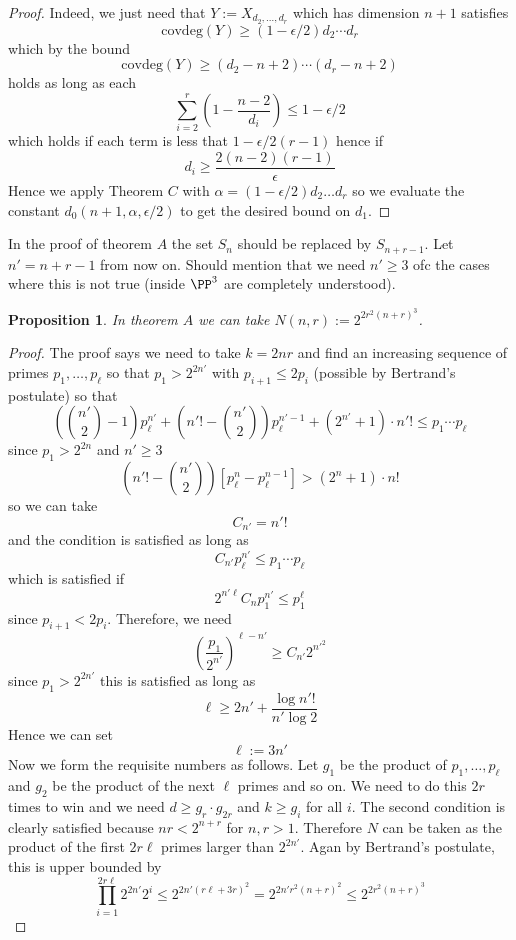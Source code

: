 \documentclass[fontsize=11pt]{amsart}
\newtheorem{prop}[thm]{Proposition}
\begin{document}
\begin{proof}
Indeed, we just need that $Y := X_{d_2, \dots, d_r}$ which has dimension $n+1$ satisfies 
\[ \mathrm{covdeg}(Y) \ge (1 - \epsilon/2) d_2 \cdots d_r \]
which by the bound
\[ \mathrm{covdeg}(Y) \ge (d_2 - n + 2) \cdots (d_r - n + 2) \]
holds as long as each
\[ \sum_{i = 2}^r \left( 1 - \frac{n-2}{d_i} \right) \le 1 - \epsilon/2 \]
which holds if each term is less that $1 - \epsilon/2(r-1)$ hence if
\[ d_i \ge \frac{2 (n-2)(r-1)}{\epsilon} \]
Hence we apply Theorem $C$ with $\alpha = (1 - \epsilon/2) d_2 \dots d_r$ so we evaluate the constant $d_0(n+1, \alpha, \epsilon/2)$ to get the desired bound on $d_1$.
\end{proof}

In the proof of theorem $A$ the set $S_n$ should be replaced by $S_{n+r-1}$. Let $n' = n+r - 1$ from now on. Should mention that we need $n' \ge 3$ ofc the cases where this is not true (inside $\PP^3$ are completely understood). 

\begin{prop}
In theorem $A$ we can take $N(n,r) := 2^{2 r^2 (n + r)^3}$.
\end{prop}

\begin{proof}
The proof says we need to take $k = 2nr$ and find an increasing sequence of primes $p_1, \dots, p_\ell$ so that $p_1 > 2^{2n'}$ with $p_{i+1} \le 2 p_i$ (possible by Bertrand's postulate) so that 
\[ \left( {n' \choose 2} - 1 \right) p_{\ell}^{n'} + \left( n'! - {n' \choose 2} \right) p_{\ell}^{n'-1} + (2^{n'} + 1) \cdot n'! \le p_1 \cdots p_{\ell} \]
since $p_1 > 2^{2n}$ and $n' \ge 3$ 
\[ \left( {n'}! - {n' \choose 2} \right) [p_{\ell}^n - p_{\ell}^{n-1}] > (2^n + 1) \cdot n! \]
so we can take 
\[ C_{n'} = n'! \]
and the condition is satisfied as long as
\[ C_{n'} p_{\ell}^{n'} \le p_1 \cdots p_{\ell} \]
which is satisfied if 
\[ 2^{n' \ell} C_n p_1^{n'} \le p_1^{\ell} \]
since $p_{i+1} < 2 p_i$. Therefore, we need
\[ \left( \frac{p_1}{2^{n'}} \right)^{\ell - n'} \ge C_{n'} 2^{n'^2} \]
since $p_1 > 2^{2n'}$ this is satisfied as long as 
\[ \ell \ge 2 n' + \frac{\log{n'!}}{n' \log{2}} \]
Hence we can set
\[ \ell := 3n' \] 
Now we form the requisite numbers as follows. Let $g_1$ be the product of $p_1, \dots, p_{\ell}$ and $g_2$ be the product of the next $\ell$ primes and so on. We need to do this $2 r$ times to win and we need $d \ge g_r \cdot g_{2r}$ and $k \ge g_i$ for all $i$. The second condition is clearly satisfied because $nr < 2^{n+r}$ for $n,r > 1$. Therefore $N$ can be taken as the product of the first $2 r \ell$ primes larger than $2^{2n'}$. Agan by Bertrand's postulate, this is upper bounded by
\[ \prod_{i = 1}^{2 r \ell} 2^{2n'} 2^i \le 2^{2 n' (r \ell + 3r)^2} = 2^{2 n' r^2 (n+r)^2} \le 2^{2 r^2 (n + r)^3} \]    
\end{proof}
\end{document}
